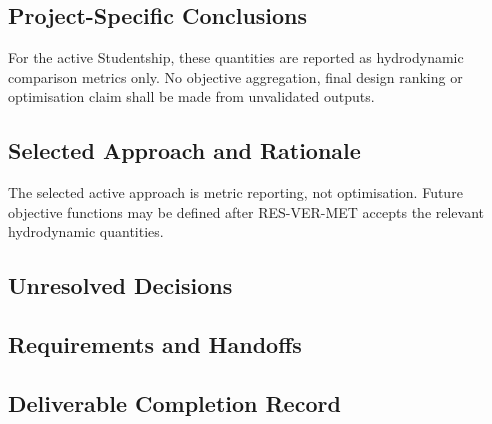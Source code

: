 
\subsection{Project-Specific Conclusions}
\label{sec:res-opt-obj-conclusions}

For the active Studentship, these quantities are reported as
hydrodynamic comparison metrics only. No objective aggregation, final
design ranking or optimisation claim shall be made from unvalidated
outputs.

\subsection{Selected Approach and Rationale}
\label{sec:res-opt-obj-selected-approach}

The selected active approach is metric reporting, not optimisation.
Future objective functions may be defined after RES-VER-MET accepts
the relevant hydrodynamic quantities.

\subsection{Unresolved Decisions}
\label{sec:res-opt-obj-unresolved-decisions}


\subsection{Requirements and Handoffs}
\label{sec:res-opt-obj-requirements}


\subsection{Deliverable Completion Record}
\label{sec:res-opt-obj-completion-record}

%
%
%
